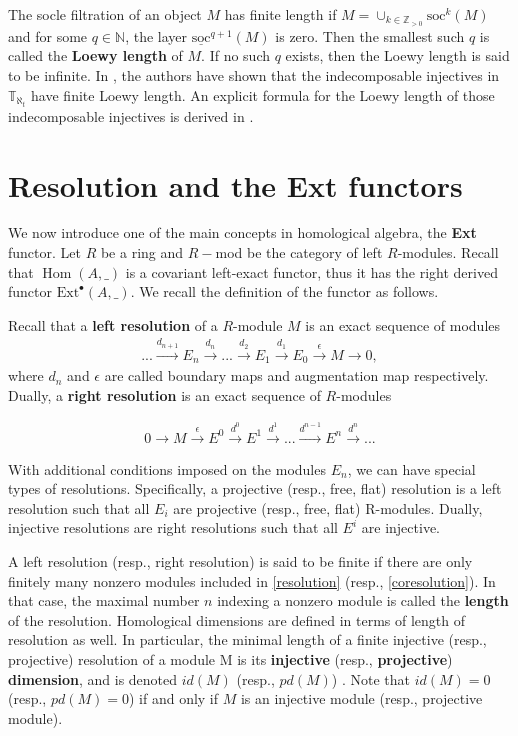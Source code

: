 \documentclass[openany, a4paper]{amsbook}
\theoremstyle{definition}
\numberwithin{equation}{chapter}
\newcommand{\T}[1]{{\mathbb{T}}_{\aleph_{#1}}}
\newcommand{\socl}[2]{\underline{\mathrm{soc}}^{#1}({#2})}
\newcommand{\soc}[2]{\mathrm{soc}^{#1}({#2})}
\DeclareMathOperator{\Hom}{\mathrm{Hom}}
\newcommand{\Ext}[4]{\mathrm{Ext}^{#1}_{#2}({#3}, {#4})}
\begin{document}
The socle filtration of an object $M$ has finite length if $M= \cup_{k \in \mathbb{Z}_{> 0}} \soc{k} M$ and for some $q \in \mathbb{N}$, the layer $\socl{q+1}{M}$ is zero. Then the smallest such $q$ is called the \textbf{Loewy length} of $M$. If no
such $q$ exists, then the Loewy length is said to be infinite. In \cite{cp17}, the authors have shown that the indecomposable injectives in $\T{t}$ have finite Loewy length. An explicit formula for the Loewy length of those indecomposable injectives is derived in \cite{p20}.

\section{Resolution and the Ext functors}
We now introduce one of the main concepts in homological algebra, the \textbf{Ext} functor. Let $R$ be a ring and $R-$mod be the category of left $R$-modules. Recall that $\Hom(A, \_)$ is a covariant left-exact functor, thus it has the right derived functor $\Ext{\bullet}{}{A}{\_}$. We recall the definition of the functor as follows.  

Recall that a \textbf{left resolution} of a $R$-module $M$ is an exact sequence of modules
\begin{align}\label{resolution}
    ... \xrightarrow{d_{n+1}} E_n \xrightarrow{d_{n}} ...  \xrightarrow{d_{2}} E_1 \xrightarrow{d_{1}} E_0 \xrightarrow{\epsilon} M \rightarrow 0,
\end{align}
where $d_n$ and $\epsilon$ are called boundary maps and augmentation map respectively. Dually, a \textbf{right resolution} is an exact sequence of $R$-modules

\begin{align}\label{coresolution}
    0 \rightarrow M \xrightarrow{\epsilon} E^0 \xrightarrow{d^{0}} E^1 \xrightarrow{d^{1}} ... \xrightarrow{d^{n-1}} E^n \xrightarrow{d^{n}} ...    
\end{align}

With additional conditions imposed on the modules $E_n$, we can have special types of resolutions. Specifically, a projective (resp., free, flat) resolution is a left resolution such that all $E_i$ are projective (resp., free, flat) R-modules. Dually, injective resolutions are right resolutions such that all $E^i$ are injective.

A left resolution (resp., right resolution) is said to be finite if there are only finitely many nonzero modules included in \ref{resolution} (resp., \ref{coresolution}). In that case, the maximal number $n$ indexing a nonzero module is called the \textbf{length} of the resolution. Homological dimensions are defined in terms of length of resolution as well. In particular, the minimal length of a finite injective (resp., projective) resolution of a module M is its \textbf{injective} (resp., \textbf{projective}) \textbf{dimension}, and is denoted $id(M)$ (resp., $pd(M)$)
\label{injective dimension}. Note that $id(M) = 0$ (resp., $pd(M) = 0$) if and only if $M$ is an injective module (resp., projective module).
\end{document}
